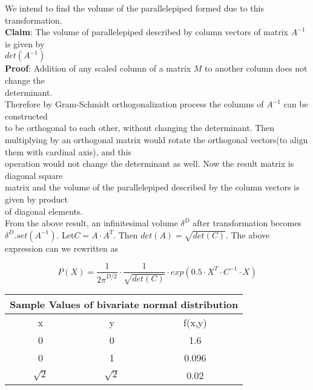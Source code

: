 \documentclass{article}
\begin{document}
We intend to find the volume of the parallelepiped formed due to this transformation.\\
\textbf{Claim}: The volume of parallelepiped described by column vectors of matrix $A^{-1}$
is given by\\
$det(A^{-1})$\\
\textbf{Proof}: Addition of any scaled column of a matrix $M$ to another column does not change the\\
determinant.\\
Therefore by Gram-Schmidt orthogonalization process the columns of $A^{-1}$
can be constructed\\
to be orthogonal to each other, without changing the determinant. Then multiplying by an orthogonal matrix would rotate the orthogonal vectors(to align them with cardinal axis), and this\\
operation would not change the determinant as well. Now the result matrix is diagonal square\\
matrix and the volume of the parallelepiped described by the column vectors is given by product\\
of diagonal elements.\\
From the above result, an infinitesimal volume $\delta^D$ after transformation becomes $\delta^D$.$set(A^{-1})$.
Let$C=A \cdot A^T$. Then $det(A) = \sqrt{det(C)}$. The above expression can we rewritten as 





\begin{equation}
P(X)=\frac{1}{{2\pi}^{D/2}} \cdot \frac{1}{\sqrt{det(C)}} \cdot exp(0.5 \cdot X^T \cdot C^{-1} \cdot X)
\end{equation}
\begin{center}\begin{tabular}{|c|c||c|}
\hline
\multicolumn{3}{|c|}{Sample Values of bivariate normal distribution}\\
\hline
x&y&f(x,y)\\
\hline
0&0&1.6\\
0&1&0.096\\
$\sqrt{2}$&$\sqrt{2}$&0.02\\
\hline
\end{tabular}
\end{center}







%

\printbibliography
\end{document}
